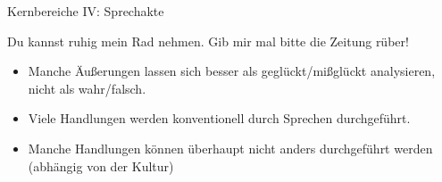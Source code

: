 \begin{frame}{Kernbereiche IV: Sprechakte}

\begin{exe}
\ex 
  \begin{xlist}
    \ex  Du kannst ruhig mein Rad nehmen.
    \ex  Gib mir mal bitte die Zeitung rüber!
  \end{xlist}

\end{exe}

  \begin{itemize}[<+->]
  \item Manche Äußerungen lassen sich besser als geglückt/mißglückt analysieren, nicht als wahr/falsch.
  \item<2-> Viele Handlungen werden konventionell durch Sprechen durchgeführt.
  \item<3-> Manche Handlungen können überhaupt nicht anders durchgeführt werden (abhängig von der Kultur)
  \end{itemize}


\end{frame}




